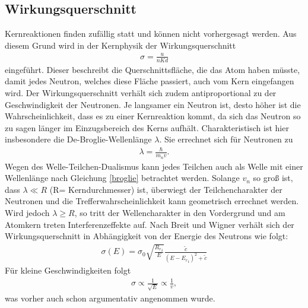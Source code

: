 	\subsection{Wirkungsquerschnitt}
Kernreaktionen finden zufällig statt und können nicht vorhergesagt werden. Aus diesem Grund wird in der Kernphysik der Wirkungsquerschnitt
\begin{align}
	\sigma= \frac{u}{nKd}
\end{align}
eingeführt. Dieser beschreibt die Querschnittsfläche, die das Atom haben müsste, damit jedes Neutron, welches diese Fläche passiert, auch vom Kern eingefangen wird. Der Wirkungsquerschnitt verhält sich zudem antiproportional zu der Geschwindigkeit der Neutronen. Je langsamer ein Neutron ist, desto höher ist die Wahrscheinlichkeit, dass es zu einer Kernreaktion kommt, da sich das Neutron so zu sagen länger im Einzugsbereich des Kerns aufhält. Charakteristisch ist hier insbesondere die De-Broglie-Wellenlänge $\lambda$. Sie errechnet sich für Neutronen zu
\begin{align}
	\lambda=\frac{\hbar}{m_n v}.
	\label{broglie}
\end{align}
Wegen des Welle-Teilchen-Dualismus kann jedes Teilchen auch als Welle mit einer Wellenlänge nach Gleichung \eqref{broglie} betrachtet werden. Solange $v_n$ so groß ist, dass $\lambda \ll R$ ({\small R= Kerndurchmesser}) ist, überwiegt der Teilchencharakter der Neutronen und die Trefferwahrscheinlichkeit kann geometrisch errechnet werden. Wird jedoch $\lambda \geq R$, so tritt der Wellencharakter in den Vordergrund und am Atomkern treten Interferenzeffekte auf. Nach Breit und Wigner verhält sich der Wirkungsquerschnitt in Abhängigkeit von der Energie des Neutrons wie folgt:
\begin{align}
	\sigma (E) = \sigma_0 \sqrt{\frac{{R_r}_i}{E}} \frac{\tilde c}{(E-{E_r}_i)^2 	+ \tilde c}
\end{align}
Für kleine Geschwindigkeiten folgt
\begin{align}
	\sigma \propto \frac{1}{\sqrt{E}} \propto \frac{1}{v},
\end{align}
was vorher auch schon argumentativ angenommen wurde.
